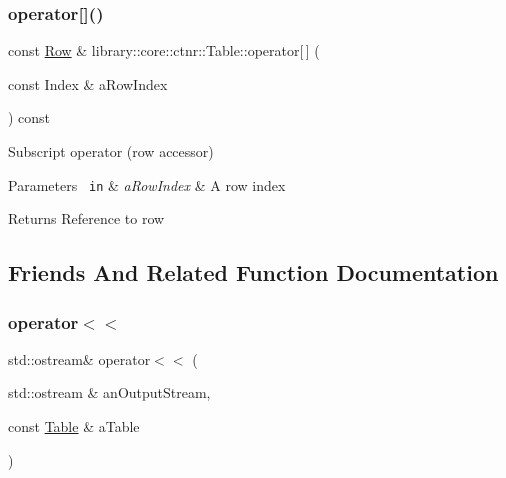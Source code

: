 \subsubsection{\texorpdfstring{operator[]()}{operator[]()}}
{\footnotesize\ttfamily const \mbox{\hyperlink{classlibrary_1_1core_1_1ctnr_1_1table_1_1_row}{Row}} \& library\+::core\+::ctnr\+::\+Table\+::operator\mbox{[}$\,$\mbox{]} (\begin{DoxyParamCaption}\item[{const Index \&}]{a\+Row\+Index }\end{DoxyParamCaption}) const}



Subscript operator (row accessor) 


\begin{DoxyCode}{0}
\end{DoxyCode}



\begin{DoxyParams}[1]{Parameters}
\mbox{\texttt{ in}}  & {\em a\+Row\+Index} & A row index \\
\hline
\end{DoxyParams}
\begin{DoxyReturn}{Returns}
Reference to row 
\end{DoxyReturn}


\subsection{Friends And Related Function Documentation}
\mbox{\label{classlibrary_1_1core_1_1ctnr_1_1_table_afaece709b2f143e4011941ae67b7adba}} 
\subsubsection{\texorpdfstring{operator$<$$<$}{operator<<}}
{\footnotesize\ttfamily std\+::ostream\& operator$<$$<$ (\begin{DoxyParamCaption}\item[{std\+::ostream \&}]{an\+Output\+Stream,  }\item[{const \mbox{\hyperlink{classlibrary_1_1core_1_1ctnr_1_1_table}{Table}} \&}]{a\+Table }\end{DoxyParamCaption})\hspace{0.3cm}{\ttfamily [friend]}}



